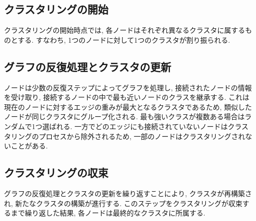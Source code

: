 \subsection{クラスタリングの開始}
クラスタリングの開始時点では, 各ノードはそれぞれ異なるクラスタに属するものとする. すなわち, 1つのノードに対して1つのクラスタが割り振られる. 

\subsection{グラフの反復処理とクラスタの更新}
ノードは少数の反復ステップによってグラフを処理し, 接続されたノードの情報を受け取り, 接続するノードの中で最も近いノードのクラスを継承する. これは現在のノードに対するエッジの重みが最大となるクラスタであるため, 類似したノードが同じクラスタにグループ化される. 最も強いクラスが複数ある場合はランダムで1つ選ばれる. 一方でどのエッジにも接続されていないノードはクラスタリングのプロセスから除外されるため, 一部のノードはクラスタリングされないことがある. 

\subsection{クラスタリングの収束}
グラフの反復処理とクラスタの更新を繰り返すことにより, クラスタが再構築され, 新たなクラスタの構築が進行する. このステップをクラスタリングが収束するまで繰り返した結果, 各ノードは最終的なクラスタに所属する. 